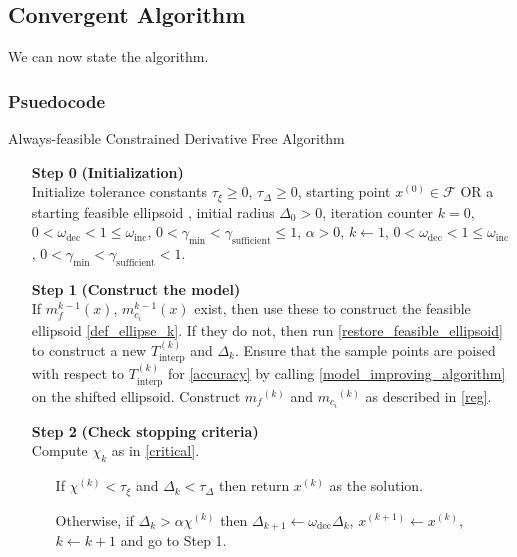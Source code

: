\documentclass{article}
\theoremstyle{case}
\newcommand{\xk}{{x^{(k)}}}
\newcommand{\dk}{\Delta_k}
\newcommand{\mfk}{{{m}_f}^{(k)}}
\newcommand{\mcik}{{{m}_{c_i}}^{(k)}}
\newcommand{\tolcrit}{\tau_{\xi}}
\newcommand{\tolrad}{\tau_{\Delta}}
\newcommand{\sampletrk}{{T_{\text{interp}}^{(k)}}}
\newcommand{\feasible}{{\mathcal F}}
\newcommand{\chik}{{\chi^{(k)}}}
\newcommand{\omegainc}{\omega_{\text{inc}}}
\newcommand{\omegadec}{\omega_{\text{dec}}}
\newcommand{\gammasm}{\gamma_{\text{min}}}
\newcommand{\gammabi}{\gamma_{\text{sufficient}}}
\begin{document}
\subsection{Convergent Algorithm}

We can now state the algorithm.


\subsubsection{Psuedocode}

\begin{algorithm}[H]
    \caption{Always-feasible Constrained Derivative Free Algorithm}
    \label{constrained_dfo}
    \begin{itemize}
        \item[\textbf{Step 0}] \textbf{(Initialization)} \\
            Initialize tolerance constants 
            $\tolcrit \ge 0$,
            $\tolrad \ge 0$,
            \color{red} starting point $x^{(0)} \in \feasible$  OR a starting feasible ellipsoid   \color{black},
            initial radius $\Delta_0 > 0$,
            iteration counter $k=0$,
            $0 < \omegadec < 1 \le \omegainc$,
            $0 < \gammasm < \gammabi \le 1$,
            $\alpha > 0$,
            $k \gets 1$,
            $0 < \omegadec < 1 \le \omegainc$,
            $0 < \gammasm < \gammabi < 1$.
            
        \item[\textbf{Step 1}] \textbf{(Construct the model)} \\
	    If $m_{f}^{k-1}(x)$, $m_{c_i}^{k-1}(x)$ exist, then use these to construct the feasible ellipsoid \cref{def_ellipse_k}.
	    If they do not, then run \cref{restore_feasible_ellipsoid} to construct a new $\sampletrk$ and $\dk$.
            Ensure that the sample points are poised with respect to $ \sampletrk $ for \cref{accuracy} by calling \cref{model_improving_algorithm} on the shifted ellipsoid.
            Construct $\mfk$ and $\mcik$ as described in \cref{reg}.
        
        \item[\textbf{Step 2}] \textbf{(Check stopping criteria)} \\
            Compute $\chi_k$ as in \cref{critical}. \begin{itemize}
                \item[] If $ \chik < \tau_{\xi} $ and $\dk <\tau_{\Delta}$ then return $\xk$ as the solution.
                \item[] Otherwise, if $\dk > \alpha \chik$ then 
                $\Delta_{k+1} \gets \omegadec\dk$, 
                $x^{(k+1)} \gets \xk$,
                $k \gets k+1$ and go to Step 1.
            \end{itemize}
        

\end{itemize}
\end{algorithm}
\end{document}
